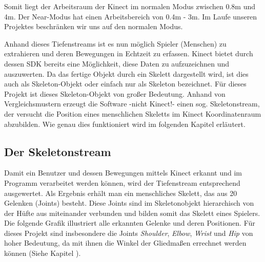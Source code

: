 Somit liegt der Arbeitsraum der Kinect im normalen Modus zwischen 0.8m und 4m. Der Near-Modus hat einen Arbeitsbereich von 0.4m - 3m. Im Laufe unseren Projektes beschränken wir uns auf den normalen Modus.

Anhand dieses Tiefenstreams ist es nun möglich Spieler (Menschen) zu extrahieren und deren Bewegungen
in Echtzeit zu erfassen. Kinect bietet durch dessen SDK bereits eine Möglichkeit, diese Daten zu
aufzuzeichnen und auszuwerten. Da das fertige Objekt durch ein Skelett dargestellt wird, ist dies auch als Skeleton-Objekt oder einfach nur als Skeleton bezeichnet. Für dieses Projekt ist dieses Skeleton-Objekt von großer Bedeutung. Anhand von Vergleichsmustern erzeugt die Software -nicht Kinect!- einen sog. Skeletonstream, der versucht die Position eines menschlichen Skeletts im Kinect Koordinatenraum abzubilden.\cite{SWB-376536934}
Wie genau dies funktioniert wird im folgenden Kapitel erläutert.



%
%
\subsection{Der Skeletonstream}\label{skeleton}
Damit ein Benutzer und dessen Bewegungen mittels Kinect erkannt und im Programm verarbeitet werden können, wird der Tiefenstream entsprechend ausgewertet. Als Ergebnis erhält man ein menschliches Skelett, das aus
20 Gelenken (Joints) besteht. Diese Joints sind im Skeletonobjekt hierarchisch von der Hüfte aus miteinander verbunden und bilden somit das Skelett eines Spielers. Die folgende Grafik illustriert alle erkannten Gelenke und deren Positionen. Für dieses Projekt sind insbesondere die Joints \textit{Shoulder}, \textit{Elbow}, \textit{Wrist} und \textit{Hip} von hoher Bedeutung, da mit ihnen die Winkel der Gliedmaßen errechnet werden können (Siehe Kapitel ).

